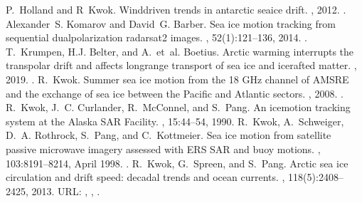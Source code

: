 \documentclass[letterpaper,10pt,english]{jupyterBook}
\begin{document}
\begin{sphinxthebibliography}{10}
\sphinxAtStartPar
P. Holland and R Kwok. Wind\sphinxhyphen{}driven trends in antarctic sea\sphinxhyphen{}ice drift. , 2012. .
\sphinxAtStartPar
Alexander S. Komarov and David G. Barber. Sea ice motion tracking from sequential dual\sphinxhyphen{}polarization radarsat\sphinxhyphen{}2 images. , 52(1):121–136, 2014. .
\sphinxAtStartPar
T. Krumpen, H.J. Belter, and A. et al. Boetius. Arctic warming interrupts the transpolar drift and affects long\sphinxhyphen{}range transport of sea ice and ice\sphinxhyphen{}rafted matter. , 2019. .
\sphinxAtStartPar
R. Kwok. Summer sea ice motion from the 18 GHz channel of AMSR\sphinxhyphen{}E and the exchange of sea ice between the Pacific and Atlantic sectors. , 2008. .
\sphinxAtStartPar
R. Kwok, J. C. Curlander, R. McConnel, and S. Pang. An ice\sphinxhyphen{}motion tracking system at the Alaska SAR Facility. , 15:44–54, 1990.
\sphinxAtStartPar
R. Kwok, A. Schweiger, D. A. Rothrock, S. Pang, and C. Kottmeier. Sea ice motion from satellite passive microwave imagery assessed with ERS SAR and buoy motions. , 103:8191–8214, April 1998. .
\sphinxAtStartPar
R. Kwok, G. Spreen, and S. Pang. Arctic sea ice circulation and drift speed: decadal trends and ocean currents. , 118(5):2408–2425, 2013. URL: , , .

\end{sphinxthebibliography}
\end{document}
